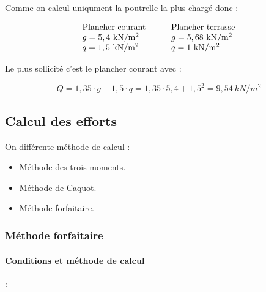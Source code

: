 \documentclass[12pt,a4paper]{article}
\begin{document}
	
	
	Comme on calcul uniqument la poutrelle la plus chargé donc :
	
	
	\[ 
	\begin{array}{l c l}
		\text{Plancher courant} &\quad& \text{Plancher terrasse} \\
		g = 5,4 ~\unit{kN\per m^{2}} &\quad& g = 5,68 ~\unit{kN\per m^{2}} \\
		q = 1,5 ~\unit{kN\per m^{2}} &\quad& q = 1 ~\unit{kN\per m^{2}}
	\end{array}
	 \]
	
	Le plus sollicité c'est le plancher courant avec :
	
	\[ Q = 1,35 \cdot g + 1,5 \cdot q = 1,35 \cdot 5,4 + 1,5^{2} = 9,54 ~\unit{kN\per m^{2}} \]
	
	
	
	\subsection{Calcul des efforts}
	
	On différente méthode de calcul :
	
	\begin{itemize}
		\item Méthode des trois moments.
		\item Méthode de Caquot.
		\item Méthode forfaitaire.
	\end{itemize}
	
	
	\subsubsection{Méthode forfaitaire}
	
	
	
	\paragraph{Conditions et méthode de calcul}:
	
\end{document}
